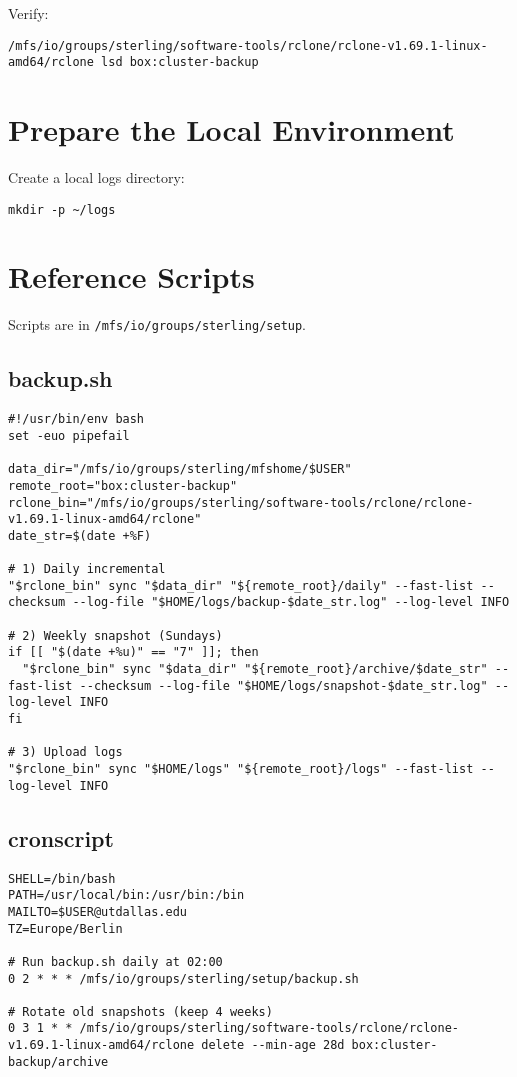 \documentclass[12pt,letterpaper]{article}
\begin{document}
Verify:
\begin{lstlisting}[style=custombash]
/mfs/io/groups/sterling/software-tools/rclone/rclone-v1.69.1-linux-amd64/rclone lsd box:cluster-backup
\end{lstlisting}

\section{Prepare the Local Environment}

Create a local logs directory:
\begin{lstlisting}[style=custombash]
mkdir -p ~/logs
\end{lstlisting}

\section{Reference Scripts}

Scripts are in \texttt{/mfs/io/groups/sterling/setup}.

\subsection{backup.sh}
\begin{lstlisting}[style=custombash]
#!/usr/bin/env bash
set -euo pipefail

data_dir="/mfs/io/groups/sterling/mfshome/$USER"
remote_root="box:cluster-backup"
rclone_bin="/mfs/io/groups/sterling/software-tools/rclone/rclone-v1.69.1-linux-amd64/rclone"
date_str=$(date +%F)

# 1) Daily incremental
"$rclone_bin" sync "$data_dir" "${remote_root}/daily" --fast-list --checksum --log-file "$HOME/logs/backup-$date_str.log" --log-level INFO

# 2) Weekly snapshot (Sundays)
if [[ "$(date +%u)" == "7" ]]; then
  "$rclone_bin" sync "$data_dir" "${remote_root}/archive/$date_str" --fast-list --checksum --log-file "$HOME/logs/snapshot-$date_str.log" --log-level INFO
fi

# 3) Upload logs
"$rclone_bin" sync "$HOME/logs" "${remote_root}/logs" --fast-list --log-level INFO
\end{lstlisting}

\subsection{cronscript}
\begin{lstlisting}[style=custombash]
SHELL=/bin/bash
PATH=/usr/local/bin:/usr/bin:/bin
MAILTO=$USER@utdallas.edu
TZ=Europe/Berlin

# Run backup.sh daily at 02:00
0 2 * * * /mfs/io/groups/sterling/setup/backup.sh

# Rotate old snapshots (keep 4 weeks)
0 3 1 * * /mfs/io/groups/sterling/software-tools/rclone/rclone-v1.69.1-linux-amd64/rclone delete --min-age 28d box:cluster-backup/archive
\end{lstlisting}
\end{document}
